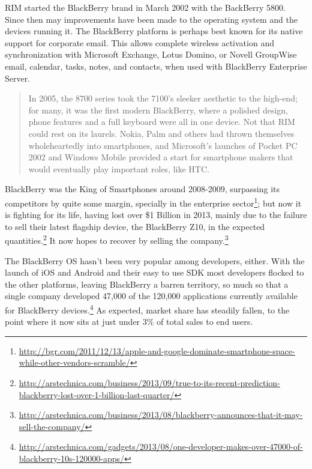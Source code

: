 RIM started the BlackBerry brand in March 2002 with the BackBerry 5800. Since then may improvements have been made to the operating system and the devices running it. The BlackBerry platform is perhaps best known for its native support for corporate email. This allows complete wireless activation and synchronization with Microsoft Exchange, Lotus Domino, or Novell GroupWise email, calendar, tasks, notes, and contacts, when used with BlackBerry Enterprise Server.
\cite{wikipedia:bb}

\begin{quotation}
In 2005, the 8700 series took the 7100's sleeker aesthetic to the high-end; for many, it was the first modern BlackBerry, where a polished design, phone features and a full keyboard were all in one device. Not that RIM could rest on its laurels. Nokia, Palm and others had thrown themselves wholeheartedly into smartphones, and Microsoft's launches of Pocket PC 2002 and Windows Mobile provided a start for smartphone makers that would eventually play important roles, like HTC.
\cite{fingas:2013}
\end{quotation}


BlackBerry was the King of Smartphones around 2008-2009, surpassing its competitors by quite some margin, specially in the enterprise sector\footnote{\url{http://bgr.com/2011/12/13/apple-and-google-dominate-smartphone-space-while-other-vendors-scramble/}}; but now it is fighting for its life, having lost over \$1 Billion in 2013, mainly due to the failure to sell their latest flagship device, the BlackBerry Z10, in the expected quantities.\footnote{\url{http://arstechnica.com/business/2013/09/true-to-its-recent-prediction-blackberry-lost-over-1-billion-last-quarter/}} It now hopes to recover by selling the company.\footnote{\url{http://arstechnica.com/business/2013/08/blackberry-announces-that-it-may-sell-the-company/}}


The BlackBerry \ac{OS} hasn't been very popular among developers, either. With the launch of iOS and Android and their easy to use \ac{SDK} most developers flocked to the other platforms, leaving BlackBerry a barren territory, so much so that a single company developed 47,000 of the 120,000 applications currently available for BlackBerry devices.\footnote{\url{http://arstechnica.com/gadgets/2013/08/one-developer-makes-over-47000-of-blackberry-10s-120000-apps/}} As expected, market share has steadily fallen, to the point where it now sits at just under 3\% of total sales to end users.
  

